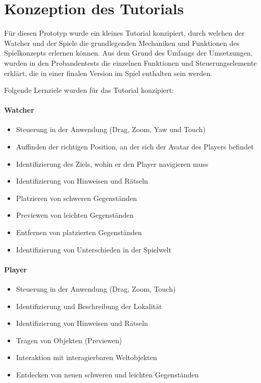 \section{Konzeption des Tutorials}
Für diesen Prototyp wurde ein kleines Tutorial konzipiert, durch welchen der Watcher und der Spiele die grundlegenden Mechaniken und Funktionen des Spielkonzepts erlernen können. Aus dem Grund des Umfangs der Umsetzungen, wurden in den Probandentests die einzelnen Funktionen und Steuerungselemente erklärt, die in einer finalen Version im Spiel enthalten sein werden.

Folgende Lernziele wurden für das Tutorial konzipiert:
\paragraph{Watcher}
\begin{itemize}
    \item Steuerung in der Anwendung (Drag, Zoom, Yaw und Touch)
    \item Auffinden der richtigen Position, an der sich der Avatar des Players befindet 
    \item Identifizierung des Ziels, wohin er den Player navigieren muss
    \item Identifizierung von Hinweisen und Rätseln
    \item Platzieren von schweren Gegenständen
    \item Previewen von leichten Gegenständen
    \item Entfernen von platzierten Gegenständen
    \item Identifizierung von Unterschieden in der Spielwelt
\end{itemize}

\paragraph{Player}

\begin{itemize}
    \item Steuerung in der Anwendung (Drag, Zoom, Touch)
    \item Identifizierung und Beschreibung der Lokalität
    \item Identifizierung von Hinweisen und Rätseln
    \item Tragen von Objekten (Previewen)
    \item Interaktion mit interagierbaren Weltobjekten
    \item Entdecken von neuen schweren und leichten Gegenständen
\end{itemize}

